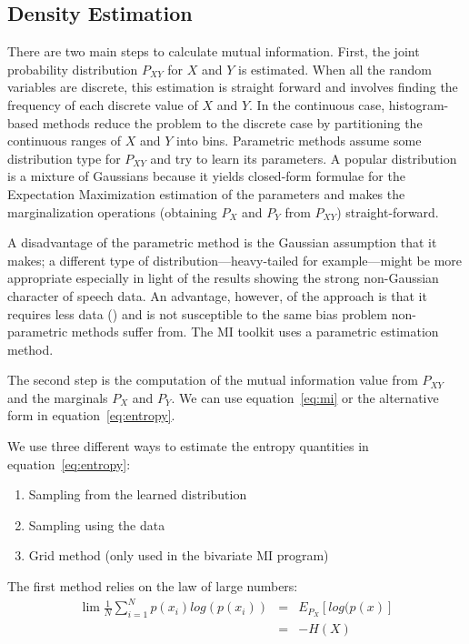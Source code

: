 \documentclass{article}
\begin{document}
\subsection{Density Estimation}

There are two main steps to calculate mutual information.  First, the
joint probability distribution $P_{XY}$ for $X$ and $Y$ is estimated.
When all the random variables are discrete, this estimation is straight
forward and involves finding the frequency of each discrete value of
$X$ and $Y$.  In the continuous case, histogram-based methods reduce
the problem to the discrete case by partitioning the continuous ranges of
$X$ and $Y$ into bins.  Parametric methods assume some distribution
type for $P_{XY}$ and try to learn its parameters.  A popular
distribution is a mixture of Gaussians because it yields closed-form
formulae for the Expectation Maximization estimation of the parameters
and makes the marginalization operations (obtaining $P_X$ and $P_Y$
from $P_{XY}$) straight-forward.

A disadvantage of the parametric method is the Gaussian assumption
that it makes; a different type of distribution---heavy-tailed for
example---might be more appropriate especially in light of the results
showing the strong non-Gaussian character of speech data. An
advantage, however, of the approach is that it requires less data
(\cite{morris92}) and is not susceptible to the same bias problem
non-parametric methods suffer from.  The MI toolkit uses a parametric
estimation method.

The second step is the computation of the mutual information value
from $P_{XY}$ and the marginals $P_X$ and $P_Y$.  We can use
equation~\ref{eq:mi} or the alternative form in equation~\ref{eq:entropy}.

We use three different ways to estimate the entropy quantities in
equation~\ref{eq:entropy}:  
\begin{enumerate}\addtolength{\itemsep}{-0.6\baselineskip}
\item Sampling from the learned distribution 
\item Sampling using the data
\item Grid method (only used in the bivariate MI program)
\end{enumerate} 

The first method relies on the law of large numbers:
\begin{eqnarray*}
\lim \frac{1}{N}\sum_{i=1}^N p(x_i) log(p(x_i)) &=& E_{P_X}[log(p(x)] \\
						&=& -H(X)
\end{eqnarray*}
\end{document}
